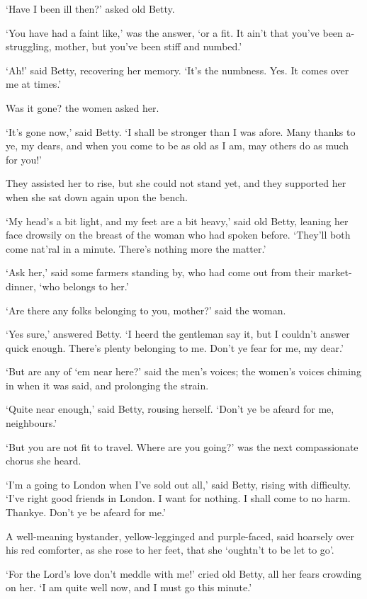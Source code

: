 ‘Have I been ill then?’ asked old Betty.

‘You have had a faint like,’ was the answer, ‘or a fit. It ain’t that
you’ve been a-struggling, mother, but you’ve been stiff and numbed.’

‘Ah!’ said Betty, recovering her memory. ‘It’s the numbness. Yes. It
comes over me at times.’

Was it gone? the women asked her.

‘It’s gone now,’ said Betty. ‘I shall be stronger than I was afore.
Many thanks to ye, my dears, and when you come to be as old as I am, may
others do as much for you!’

They assisted her to rise, but she could not stand yet, and they
supported her when she sat down again upon the bench.

‘My head’s a bit light, and my feet are a bit heavy,’ said old Betty,
leaning her face drowsily on the breast of the woman who had spoken
before. ‘They’ll both come nat’ral in a minute. There’s nothing more the
matter.’

‘Ask her,’ said some farmers standing by, who had come out from their
market-dinner, ‘who belongs to her.’

‘Are there any folks belonging to you, mother?’ said the woman.

‘Yes sure,’ answered Betty. ‘I heerd the gentleman say it, but I
couldn’t answer quick enough. There’s plenty belonging to me. Don’t ye
fear for me, my dear.’

‘But are any of ‘em near here?’ said the men’s voices; the women’s
voices chiming in when it was said, and prolonging the strain.

‘Quite near enough,’ said Betty, rousing herself. ‘Don’t ye be afeard
for me, neighbours.’

‘But you are not fit to travel. Where are you going?’ was the next
compassionate chorus she heard.

‘I’m a going to London when I’ve sold out all,’ said Betty, rising with
difficulty. ‘I’ve right good friends in London. I want for nothing. I
shall come to no harm. Thankye. Don’t ye be afeard for me.’

A well-meaning bystander, yellow-legginged and purple-faced, said
hoarsely over his red comforter, as she rose to her feet, that she
‘oughtn’t to be let to go’.

‘For the Lord’s love don’t meddle with me!’ cried old Betty, all her
fears crowding on her. ‘I am quite well now, and I must go this minute.’

